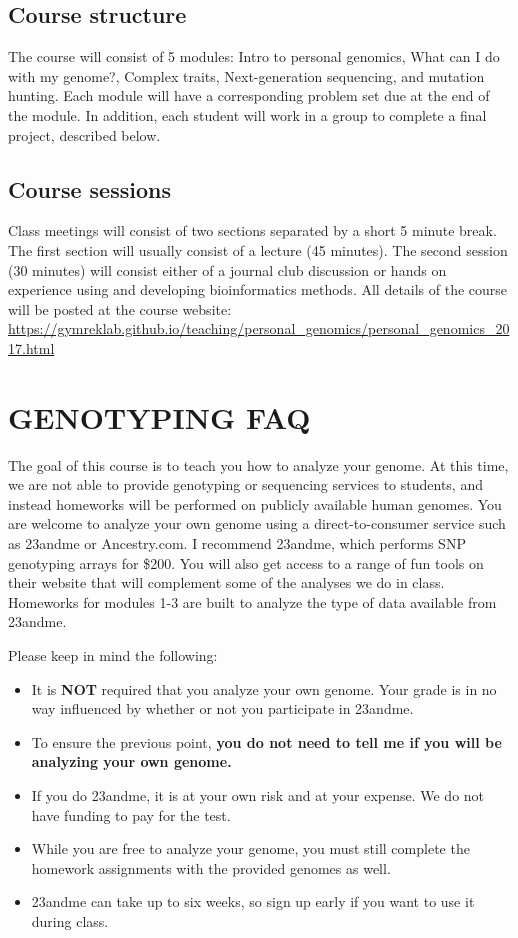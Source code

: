 \documentclass[12pt]{article}
\begin{document}
\subsection*{Course structure}
The course will consist of 5 modules: Intro to personal genomics, What can I do with my genome?, Complex traits, Next-generation sequencing, and mutation hunting. Each module will have a corresponding problem set due at the end of the module. In addition, each student will work in a group to complete a final project, described below.

\subsection*{Course sessions}
Class meetings will consist of two sections separated by a short 5 minute break. The first section will usually consist of a lecture (45 minutes). The second session (30 minutes) will consist either of a journal club discussion or hands on experience using and developing bioinformatics methods. All details of the course will be posted at the course website:\\
\href{https://gymreklab.github.io/teaching/personal\_genomics/personal\_genomics_2017.html}{https://gymreklab.github.io/teaching/personal\_genomics/personal\_genomics\_2017.html}


\section*{GENOTYPING FAQ}
The goal of this course is to teach you how to analyze your genome. At this time, we are not able to provide genotyping or sequencing services to students, and instead homeworks will be performed on publicly available human genomes. You are welcome to analyze your own genome using a direct-to-consumer service such as 23andme or Ancestry.com. I recommend 23andme, which performs SNP genotyping arrays for \$200. You will also get access to a range of fun tools on their website that will complement some of the analyses we do in class. Homeworks for modules 1-3 are built to analyze the type of data available from 23andme. 

Please keep in mind the following:
\begin{itemize}
\setlength\itemsep{0.0em}
\item It is \textbf{NOT} required that you analyze your own genome. Your grade is in no way influenced by whether or not you participate in 23andme.
\item To ensure the previous point, \textbf{you do not need to tell me if you will be analyzing your own genome.}
\item If you do 23andme, it is at your own risk and at your expense. We do not have funding to pay for the test.
\item While you are free to analyze your genome, you must still complete the homework assignments with the provided genomes as well.
\item 23andme can take up to six weeks, so sign up early if you want to use it during class.
\end{itemize}
\end{document}
